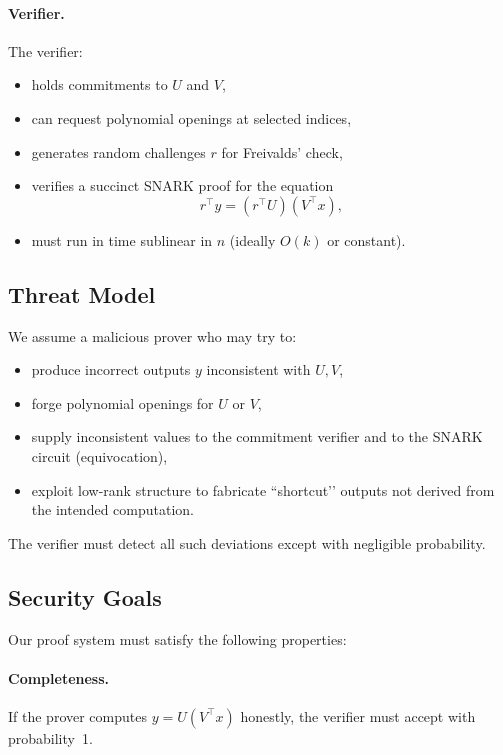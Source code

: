 \documentclass[11pt]{article}
\begin{document}
\paragraph{Verifier.}
The verifier:
\begin{itemize}
  \item holds commitments to $U$ and $V$,
  \item can request polynomial openings at selected indices,
  \item generates random challenges $r$ for Freivalds' check,
  \item verifies a succinct SNARK proof for the equation
        \[
          r^\top y = (r^\top U)(V^\top x),
        \]
  \item must run in time sublinear in $n$ (ideally $O(k)$ or constant).
\end{itemize}

\subsection{Threat Model}

We assume a malicious prover who may try to:
\begin{itemize}
  \item produce incorrect outputs $y$ inconsistent with $U, V$,
  \item forge polynomial openings for $U$ or $V$,
  \item supply inconsistent values to the commitment verifier and to the
        SNARK circuit (equivocation),
  \item exploit low-rank structure to fabricate “shortcut’’ outputs not
        derived from the intended computation.
\end{itemize}

The verifier must detect all such deviations except with negligible
probability.

\subsection{Security Goals}

Our proof system must satisfy the following properties:

\paragraph{Completeness.}
If the prover computes $y = U(V^\top x)$ honestly, the verifier must
accept with probability~1.
\end{document}
